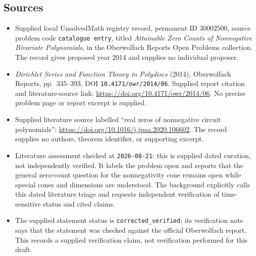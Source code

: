 \documentclass[11pt]{article}
\begin{document}
\subsection{Sources}
\begin{itemize}
\item Supplied local UnsolvedMath registry record, permanent ID \(30002500\), source problem code \texttt{catalogue entry}, titled \emph{Attainable Zero Counts of Nonnegative Bivariate Polynomials}, in the Oberwolfach Reports Open Problems collection. The record gives proposed year 2014 and supplies no individual proposer.
\item \emph{Dirichlet Series and Function Theory in Polydiscs} (2014), Oberwolfach Reports, pp.~335--393, DOI \texttt{10.4171/owr/2014/06}. Supplied report citation and literature-source link: \url{https://doi.org/10.4171/owr/2014/06}. No precise problem page or report excerpt is supplied.
\item Supplied literature source labelled ``real zeros of nonnegative circuit polynomials'': \url{https://doi.org/10.1016/j.jpaa.2020.106602}. The record supplies no authors, theorem identifier, or supporting excerpt.
\item Literature assessment checked at \texttt{2026-08-21}: this is supplied dated curation, not independently verified. It labels the problem open and reports that the general zero-count question for the nonnegativity cone remains open while special cones and dimensions are understood. The background explicitly calls this dated literature triage and requests independent verification of time-sensitive status and cited claims.
\item The supplied statement status is \texttt{corrected\_verified}; its verification note says that the statement was checked against the official Oberwolfach report. This records a supplied verification claim, not verification performed for this draft.
\end{itemize}
\end{document}
